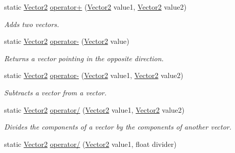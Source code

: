 \begin{DoxyCompactItemize}
static \hyperlink{structMicrosoft_1_1Xna_1_1Framework_1_1Vector2}{Vector2} \hyperlink{structMicrosoft_1_1Xna_1_1Framework_1_1Vector2_a6502037fe8634172afc61445f7f6aa26}{operator+} (\hyperlink{structMicrosoft_1_1Xna_1_1Framework_1_1Vector2}{Vector2} value1, \hyperlink{structMicrosoft_1_1Xna_1_1Framework_1_1Vector2}{Vector2} value2)
\begin{DoxyCompactList}\small\item\em Adds two vectors.\end{DoxyCompactList}\item 
static \hyperlink{structMicrosoft_1_1Xna_1_1Framework_1_1Vector2}{Vector2} \hyperlink{structMicrosoft_1_1Xna_1_1Framework_1_1Vector2_adf285505a7c033d359372521858bca6f}{operator-\/} (\hyperlink{structMicrosoft_1_1Xna_1_1Framework_1_1Vector2}{Vector2} value)
\begin{DoxyCompactList}\small\item\em Returns a vector pointing in the opposite direction.\end{DoxyCompactList}\item 
static \hyperlink{structMicrosoft_1_1Xna_1_1Framework_1_1Vector2}{Vector2} \hyperlink{structMicrosoft_1_1Xna_1_1Framework_1_1Vector2_a27d2216c7194880066fe22a098829028}{operator-\/} (\hyperlink{structMicrosoft_1_1Xna_1_1Framework_1_1Vector2}{Vector2} value1, \hyperlink{structMicrosoft_1_1Xna_1_1Framework_1_1Vector2}{Vector2} value2)
\begin{DoxyCompactList}\small\item\em Subtracts a vector from a vector.\end{DoxyCompactList}\item 
static \hyperlink{structMicrosoft_1_1Xna_1_1Framework_1_1Vector2}{Vector2} \hyperlink{structMicrosoft_1_1Xna_1_1Framework_1_1Vector2_a8328a5e6a759d6773d363ee9a2afd363}{operator/} (\hyperlink{structMicrosoft_1_1Xna_1_1Framework_1_1Vector2}{Vector2} value1, \hyperlink{structMicrosoft_1_1Xna_1_1Framework_1_1Vector2}{Vector2} value2)
\begin{DoxyCompactList}\small\item\em Divides the components of a vector by the components of another vector.\end{DoxyCompactList}\item 
static \hyperlink{structMicrosoft_1_1Xna_1_1Framework_1_1Vector2}{Vector2} \hyperlink{structMicrosoft_1_1Xna_1_1Framework_1_1Vector2_a295f964f53d68fb35714bd2ed198727c}{operator/} (\hyperlink{structMicrosoft_1_1Xna_1_1Framework_1_1Vector2}{Vector2} value1, float divider)

\end{DoxyCompactItemize}
